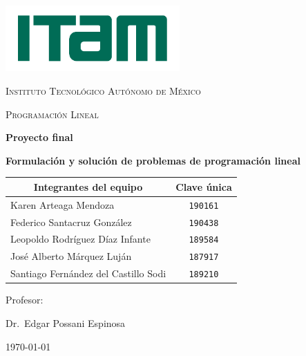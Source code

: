 \begin{titlepage}
	\centering
	\includegraphics[width=0.5\textwidth]{logo-ITAM.pdf}\par\vspace{1cm}
	{\scshape\large Instituto Tecnológico Autónomo de México \par}
	\vspace{2.5cm}
	
	{\scshape\Large Programación Lineal\par}
	\vspace{1.5cm}
	{\LARGE\bfseries Proyecto final\par}
    \vspace{0.5cm}
	{\large\bfseries Formulación y solución de problemas de programación lineal}
	\vspace{3cm}
	
	{\large
	\begin{tabular}{||l c||} 
         \hline
         \multicolumn{1}{||c}{\textbf{Integrantes del equipo}} & \textbf{Clave única} \\
         \hline\hline
         Karen Arteaga Mendoza & \texttt{190161} \\ 
         \hline
         Federico Santacruz González & \texttt{190438}\\
         \hline
         Leopoldo Rodríguez Díaz Infante & \texttt{189584} \\ 
         \hline
         José Alberto Márquez Luján & \texttt{187917} \\
         \hline
         Santiago Fernández del Castillo Sodi & \texttt{189210} \\
         \hline
    \end{tabular}
    }
	\vfill
	Profesor:\par
	Dr.~Edgar Possani Espinosa

	\vfill
	{\today\par}
\end{titlepage}